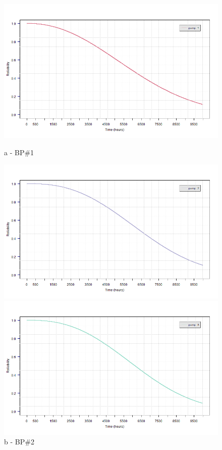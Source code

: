 \begin{figure}[!htb]
	\begin{minipage}[b]{0.5\linewidth}
		\centering
		\includegraphics[width=\textwidth]{figures/ch05_fig_sur_pump1}
		\caption*{a - BP\#1}
	\end{minipage}
	\hspace{0.05cm}
	\begin{minipage}[b]{0.5\linewidth}
		\centering
		\includegraphics[width=\textwidth]{figures/ch05_fig_sur_pump2}
		\caption*{b - BP\#2}
	\end{minipage}
	\hspace{0.05cm}
	\begin{minipage}[b]{0.5\linewidth}
		\centering
		\includegraphics[width=\textwidth]{figures/ch05_fig_sur_pump3}

\end{minipage}
\end{figure}

